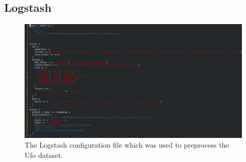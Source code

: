 \documentclass[bibliography=totoc]{article}
\begin{document}
\subsection{Logstash}
\begin{figure}
\includegraphics[height=0.5\textwidth]{logstash_config.png}
\caption{\label{logstash_config_file}
The Logstash configuration file which was used to preprocess the Ufo dataset.}
\end{figure}
\end{document}
